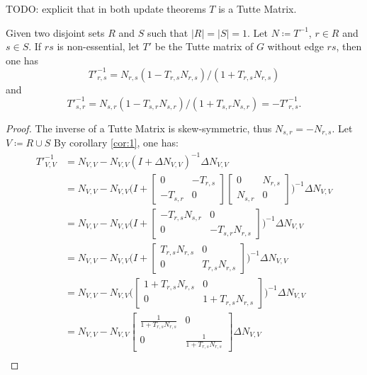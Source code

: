 TODO: explicit that in both update theorems \(T\) is a Tutte Matrix.

\begin{theorem}[Update 1]
    Given two disjoint sets \(R\) and \(S\) such that \(|R| = |S| = 1\).
    Let \(N \coloneqq T^{-1}\), \(r \in R\) and \(s \in S\).
    If \(rs\) is non-essential, let \(T'\) be the Tutte matrix of \(G\) without edge \(rs\), then one has
    \[
        {T'}^{-1}_{r, s} = N_{r, s} (1 - T_{r, s} N_{r, s}) / (1 + T_{r, s} N_{r, s})
    \]
    and
    \[
        {T'}^{-1}_{s, r} = N_{s, r} (1 - T_{s, r} N_{s, r}) / (1 + T_{s, r} N_{s, r}) = -{T'}^{-1}_{r, s}.
    \]
\end{theorem}

\begin{proof}
    The inverse of a Tutte Matrix is skew-symmetric, thus \(N_{s, r} = -N_{r, s}\).
    Let \(V \coloneqq R \cup S\)
    By corollary \ref{cor:1}, one has:
    \begin{align}
        {T'}^{-1}_{V, V} &= N_{V, V} - N_{V, V} (I + \Delta N_{V, V})^{-1} \Delta N_{V, V} \\
        &= N_{V, V} - N_{V, V} \bigg(I + \begin{bmatrix} 0 & -T_{r, s} \\ -T_{s, r} & 0 \end{bmatrix} \begin{bmatrix} 0 & N_{r, s} \\ N_{s, r} & 0 \end{bmatrix}\bigg)^{-1} \Delta N_{V, V} \\
        &= N_{V, V} - N_{V, V} \bigg(I + \begin{bmatrix} -T_{r, s} N_{s, r} & 0 \\ 0 & -T_{s, r} N_{r, s} \end{bmatrix} \bigg)^{-1} \Delta N_{V, V} \\
        &= N_{V, V} - N_{V, V} \bigg(I + \begin{bmatrix} T_{r, s} N_{r, s} & 0 \\ 0 & T_{r, s} N_{r, s} \end{bmatrix} \bigg)^{-1} \Delta N_{V, V} \\
        &= N_{V, V} - N_{V, V} \bigg(\begin{bmatrix} 1 + T_{r, s} N_{r, s} & 0 \\ 0 & 1 + T_{r, s} N_{r, s} \end{bmatrix} \bigg)^{-1} \Delta N_{V, V} \\
        &= N_{V, V} - N_{V, V} \begin{bmatrix} \frac{1}{1 + T_{r, s} N_{r, s}} & 0 \\ 0 & \frac{1}{1 + T_{r, s} N_{r, s}} \end{bmatrix} \Delta N_{V, V} \\

\end{align}
\end{proof}
